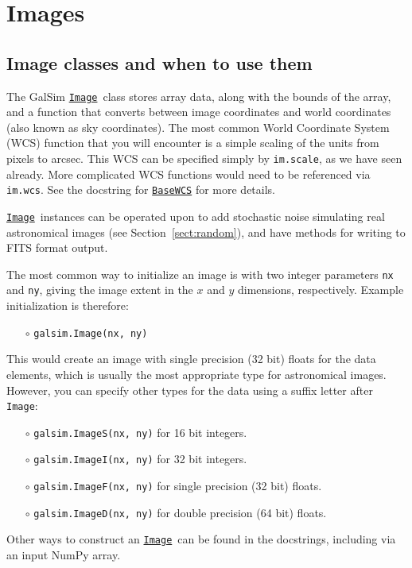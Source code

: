 \documentclass[preprint,10pt]{../../devel/modules/aastex}
\newcommand\Image{\href{http://galsim-developers.github.io/GalSim/classgalsim_1_1image_1_1_image.html}{\texttt{Image}}}
\begin{document}
\section{Images}\label{sect:image}

\subsection{Image classes and when to use them}\label{sect:imageclasses}
The GalSim \Image\ class stores array data, along with the bounds
of the array, and a
function that converts between image coordinates and world coordinates
(also known as sky coordinates).  The most common World Coordinate System
(WCS) function that you will encounter is a simple scaling of the units
from pixels to arcsec.  This WCS can be specified simply by \texttt{im.scale},
as we have seen already.  More complicated WCS functions would need to
be referenced via \texttt{im.wcs}. 
See the docstring for \href{http://galsim-developers.github.io/GalSim/classgalsim_1_1wcs_1_1_base_w_c_s.html}{\texttt{BaseWCS}}
for more details.

\Image\ instances can be operated upon to add stochastic noise
simulating real astronomical images (see Section~\ref{sect:random}),
and have methods for writing to FITS format output.

The most common way to initialize an
image is with two integer parameters \texttt{nx} and \texttt{ny},
giving the image extent in the $x$ and $y$ dimensions, respectively.
Example initialization is therefore:
\begin{itemize}
\item[$\circ$] \texttt{galsim.Image(nx, ny)}
\end{itemize}
This would create an image with single precision (32 bit) floats for the data elements, which
is usually the most appropriate type for astronomical images.  However, you can specify
other types for the data using a suffix letter after \texttt{Image}:
\begin{itemize}
\item[$\circ$] \texttt{galsim.ImageS(nx, ny)} {for 16 bit integers.}

\item[$\circ$] \texttt{galsim.ImageI(nx, ny)} {for 32 bit integers.}

\item[$\circ$] \texttt{galsim.ImageF(nx, ny)} {for single precision (32 bit) floats.}

\item[$\circ$] \texttt{galsim.ImageD(nx, ny)} {for double precision (64 bit) floats.}
\end{itemize}
Other ways to construct an \Image\ can be found in the
docstrings, including via an input NumPy array.
\end{document}
